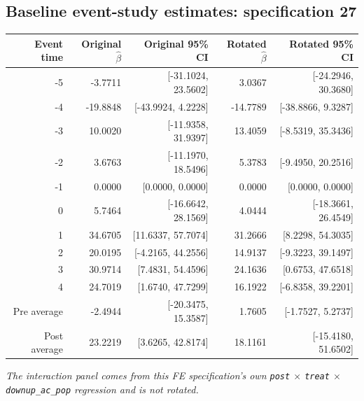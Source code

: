 \documentclass[10pt]{article}
\begin{document}
\subsection*{Baseline event-study estimates: specification 27}
\begin{center}
\scriptsize
\begin{tabular}{r rr rr}
\toprule
Event time & Original $\hat\beta$ & Original 95\% CI & Rotated $\hat\beta$ & Rotated 95\% CI \\
\midrule
-5 & -3.7711 & [-31.1024, 23.5602] & 3.0367 & [-24.2946, 30.3680] \\
-4 & -19.8848 & [-43.9924, 4.2228] & -14.7789 & [-38.8866, 9.3287] \\
-3 & 10.0020 & [-11.9358, 31.9397] & 13.4059 & [-8.5319, 35.3436] \\
-2 & 3.6763 & [-11.1970, 18.5496] & 5.3783 & [-9.4950, 20.2516] \\
-1 & 0.0000 & [0.0000, 0.0000] & 0.0000 & [0.0000, 0.0000] \\
0 & 5.7464 & [-16.6642, 28.1569] & 4.0444 & [-18.3661, 26.4549] \\
1 & 34.6705 & [11.6337, 57.7074] & 31.2666 & [8.2298, 54.3035] \\
2 & 20.0195 & [-4.2165, 44.2556] & 14.9137 & [-9.3223, 39.1497] \\
3 & 30.9714 & [7.4831, 54.4596] & 24.1636 & [0.6753, 47.6518] \\
4 & 24.7019 & [1.6740, 47.7299] & 16.1922 & [-6.8358, 39.2201] \\
\midrule
Pre average & -2.4944 & [-20.3475, 15.3587] & 1.7605 & [-1.7527, 5.2737] \\
Post average & 23.2219 & [3.6265, 42.8174] & 18.1161 & [-15.4180, 51.6502] \\
\bottomrule
\end{tabular}
\end{center}
\medskip
\textit{The interaction panel comes from this FE specification's own \texttt{post} $\times$ \texttt{treat} $\times$ \texttt{downup\_ac\_pop} regression and is not rotated.}
\clearpage
\end{document}
